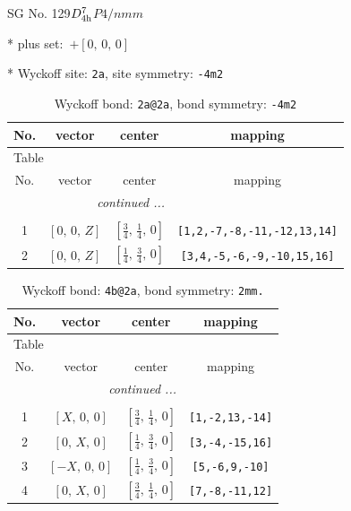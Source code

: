 \documentclass[fleqn,8pt]{jsarticle}
\begin{document}
\setcounter{MaxMatrixCols}{32}

\renewcommand{\tablename}{Table~}
\renewcommand{\figurename}{Figure~}
\begin{center}
\LARGE
SG No. 129\quad$D_{\rm 4h}^{7}$\quad$P4/nmm$\quad[ tetragonal ]
\end{center}

* plus set:\,\,\,$+\left[ 0,\, 0,\, 0 \right]$


* Wyckoff site: {\tt 2a}, site symmetry: {\tt -4m2}
\renewcommand{\arraystretch}{1.2}
\begin{longtable}{cccc}
\caption{Wyckoff bond: {\tt 2a@2a}, bond symmetry: {\tt -4m2}}
 \\
 \hline \hline
No. & vector & center & mapping \\ \hline \endfirsthead

\multicolumn{3}{l}{\tablename\ \thetable{}} \\
 \hline \hline
No. & vector & center & mapping \\ \hline \endhead

 \hline \hline
\multicolumn{3}{r}{\footnotesize\it continued ...} \\ \endfoot

 \hline \hline
\multicolumn{3}{r}{} \\ \endlastfoot

1 & $\left[ 0,\, 0,\, Z \right]$ & $\left[ \frac{3}{4},\, \frac{1}{4},\, 0 \right]$ & {\tt [1,2,-7,-8,-11,-12,13,14]} \\ \hline
2 & $\left[ 0,\, 0,\, Z \right]$ & $\left[ \frac{1}{4},\, \frac{3}{4},\, 0 \right]$ & {\tt [3,4,-5,-6,-9,-10,15,16]} \\
\end{longtable}
\renewcommand{\arraystretch}{1.2}
\begin{longtable}{cccc}
\caption{Wyckoff bond: {\tt 4b@2a}, bond symmetry: {\tt 2mm.}}
 \\
 \hline \hline
No. & vector & center & mapping \\ \hline \endfirsthead

\multicolumn{3}{l}{\tablename\ \thetable{}} \\
 \hline \hline
No. & vector & center & mapping \\ \hline \endhead

 \hline \hline
\multicolumn{3}{r}{\footnotesize\it continued ...} \\ \endfoot

 \hline \hline
\multicolumn{3}{r}{} \\ \endlastfoot

1 & $\left[ X,\, 0,\, 0 \right]$ & $\left[ \frac{3}{4},\, \frac{1}{4},\, 0 \right]$ & {\tt [1,-2,13,-14]} \\ \hline
2 & $\left[ 0,\, X,\, 0 \right]$ & $\left[ \frac{1}{4},\, \frac{3}{4},\, 0 \right]$ & {\tt [3,-4,-15,16]} \\ \hline
3 & $\left[ - X,\, 0,\, 0 \right]$ & $\left[ \frac{1}{4},\, \frac{3}{4},\, 0 \right]$ & {\tt [5,-6,9,-10]} \\ \hline
4 & $\left[ 0,\, X,\, 0 \right]$ & $\left[ \frac{3}{4},\, \frac{1}{4},\, 0 \right]$ & {\tt [7,-8,-11,12]} \\
\end{longtable}
\end{document}
